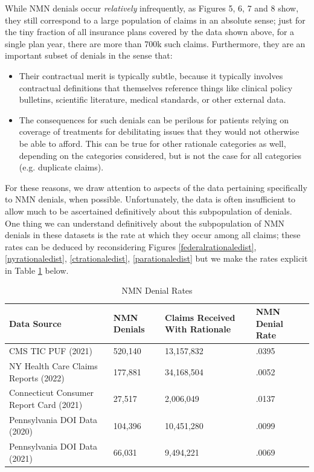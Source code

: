\documentclass[12pt, a4paper,twoside]{report}
\theoremstyle{plain} %
\theoremstyle{definition} %
\theoremstyle{remark} %
\numberwithin{equation}{chapter}
\begin{document}
		While NMN denials occur \emph{relatively} infrequently, as Figures 5, 6, 7 and 8 show, they still correspond to a large population of claims in an absolute sense; just for the tiny fraction of all insurance plans covered by the data shown above, for a single plan year, there are more than 700k such claims. Furthermore, they are an important subset of denials in the sense that:\\
		
		\begin{itemize}
			\item Their contractual merit is typically subtle, because it typically involves contractual definitions that themselves reference things like clinical policy bulletins, scientific literature, medical standards, or other external data.
			\item The consequences for such denials can be perilous for patients relying on coverage of treatments for debilitating issues that they would not otherwise be able to afford. This can be true for other rationale categories as well, depending on the categories considered, but is not the case for all categories (e.g. duplicate claims).
		\end{itemize}
	
		For these reasons, we draw attention to aspects of the data pertaining specifically to NMN denials, when possible. Unfortunately, the data is often insufficient to allow much to be ascertained definitively about this subpopulation of denials.\\
		
		One thing we can understand definitively about the subpopulation of NMN denials in these datasets is the rate at which they occur among all claims; these rates can be deduced by reconsidering Figures \ref{federalrationaledist}, \ref{nyrationaledist}, \ref{ctrationaledist}, \ref{parationaledist} but we make the rates explicit in Table  \ref{nmndenialratetable} below.\\
		
		\begin{table}[!ht]
			\centering
			\begin{tabular}{|p{5cm}|p{3cm}|p{4cm}|p{3cm}|}
				\hline
				\textbf{Data Source} & \textbf{NMN Denials} & \textbf{Claims Received \newline With Rationale} & \textbf{NMN Denial \newline Rate}  \\ \hline
				CMS TIC PUF (2021) & 520,140 & 13,157,832 & .0395 \\ \hline
				NY Health Care Claims Reports (2022) & 177,881 & 34,168,504 & 	.0052 \\ \hline
				Connecticut Consumer Report Card (2021) & 27,517 & 2,006,049 &  .0137 \\ \hline
				Pennsylvania DOI Data (2020) & 104,396 & 10,451,280 &  .0099 \\ \hline
				Pennsylvania DOI Data (2021) & 66,031 & 	9,494,221 &  	.0069 \\ \hline
			\end{tabular}
			\caption{NMN Denial Rates}
			\label{nmndenialratetable}
		\end{table}
		
\end{document}
